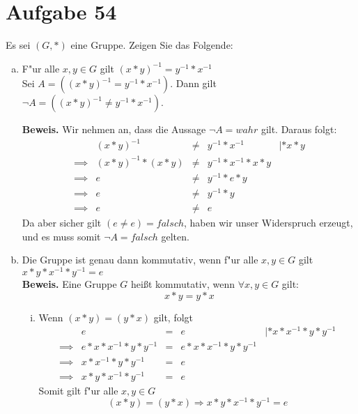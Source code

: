 \documentclass[10pt, oneside]{article}
\begin{document}
\section{Aufgabe 54}

Es sei $(G, *)$ eine Gruppe. Zeigen Sie das Folgende:
\begin{enumerate}[(a)]
    \item F"ur alle $x, y \in G$ gilt $(x * y)^{-1} = y^{-1} * x^{-1}$ \\[5pt]
        Sei $A = ((x * y)^{-1} = y^{-1} * x^{-1})$. Dann gilt $\lnot A = ((x * y)^{-1} \neq y^{-1} * x^{-1})$.

        \textbf{Beweis.} Wir nehmen an, dass die Aussage $\lnot A = wahr$ gilt.
        Daraus folgt:
        \begin{equation*}
            \begin{array}{rrcll}
                        &(x * y)^{-1} &\neq& y^{-1} * x^{-1} &| * x * y \\[5pt]
                \implies&(x * y)^{-1} * (x * y) &\neq& y^{-1} * x^{-1} * x * y \\[5pt]
                \implies&e &\neq& y^{-1} * e * y \\[5pt]
                \implies&e &\neq& y^{-1} * y \\[5pt]
                \implies&e &\neq& e
            \end{array}
        \end{equation*}
        Da aber sicher gilt $(e \neq e) = falsch$, haben wir unser Widerspruch
        erzeugt, und es muss somit $\lnot A = falsch$ gelten.
    \item Die Gruppe ist genau dann kommutativ, wenn f"ur alle $x, y \in G$
        gilt $x * y * x^{-1} * y^{-1} = e$ \\[5pt]
        \textbf{Beweis.}
        Eine Gruppe $G$ hei{\ss}t kommutativ, wenn $\forall x, y \in G$ gilt:
            \begin{equation*}
                x * y = y * x
            \end{equation*}
        \begin{enumerate}[i)]
            \item Wenn $(x * y) = (y * x)$ gilt, folgt
                \begin{equation*}
                    \begin{array}{rrcll}
                                 &e &=& e &| * x * x^{-1} * y * y^{-1}\\[5pt]
                        \implies &e * x * x^{-1} * y * y^{-1} &=& e * x * x^{-1} * y * y^{-1} & \\[5pt]
                        \implies &x * x^{-1} * y * y^{-1} &=& e \\[5pt]
                        \implies &x * y * x^{-1} * y^{-1} &=& e
                    \end{array}
                \end{equation*}
                Somit gilt f"ur alle $x, y \in G$
                $$(x * y) = (y * x) \Rightarrow x * y * x^{-1} * y^{-1} = e$$


\end{enumerate}
\end{enumerate}
\end{document}
